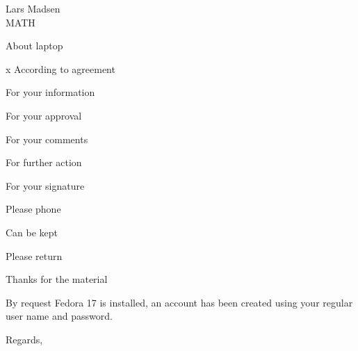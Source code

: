 \documentclass[english,unit=imfau]{aultrdesign}
\begin{document}
\begin{ColophonData}
\end{ColophonData}

\begin{InformationArea}
  Lars Madsen\\
  MATH
\end{InformationArea}

\begin{coveringnote}

\opening{About laptop}

\begin{coveringnotelist}
\item[x] According to agreement
\item For your information
\item For your approval
\item For your comments
\item For further action
\item For your signature
\item Please phone
\item Can be kept
\item Please return
\item Thanks for the material
\end{coveringnotelist}

By request Fedora 17 is installed, an account has been created using your
regular user name and password. 


\closing{Regards,}

\end{coveringnote}
\end{document}
